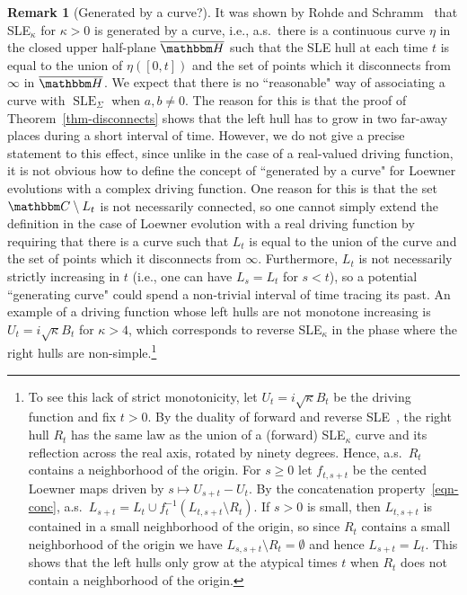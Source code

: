 \documentclass[11pt]{article}
\theoremstyle{plain}
\theoremstyle{definition}
\newtheorem{remark}[thm]{Remark}
\numberwithin{equation}{section}
\newcommand{\BB}{\mathbbm}
\newcommand{\ol}{\overline}
\newcommand{\SLEG}{{\operatorname{SLE}}_\Sigma}
\begin{document}
\begin{remark}[Generated by a curve?] \label{remark-curve}
It was shown by Rohde and Schramm~\cite{schramm-sle} that SLE$_\kappa$ for $\kappa > 0$ is generated by a curve, i.e., a.s.\ there is a continuous curve $\eta$ in the closed upper half-plane $\ol{\BB H}$ such that the SLE hull at each time $t$ is equal to the union of $\eta([0,t])$ and the set of points which it disconnects from $\infty$ in $\ol{\BB H}$. 
We expect that there is no ``reasonable" way of associating a curve with $\SLEG$ when $a,b\not=0$. The reason for this is that the proof of Theorem~\ref{thm-disconnects} shows that the left hull has to grow in two far-away places during a short interval of time. However, we do not give a precise statement to this effect, since unlike in the case of a real-valued driving function, it is not obvious how to define the concept of ``generated by a curve" for Loewner evolutions with a complex driving function. One reason for this is that the set $\BB C\setminus L_t$ is not necessarily connected, so one cannot simply extend the definition in the case of Loewner evolution with a real driving function by requiring that there is a curve such that $L_t$ is equal to the union of the curve and the set of points which it disconnects from $\infty$. 
Furthermore, $L_t$ is not necessarily strictly increasing in $t$ (i.e., one can have $L_s = L_t$ for $s<t$), so a potential ``generating curve" could spend a non-trivial interval of time tracing its past. 
An example of a driving function whose left hulls are not monotone increasing is $U_t = i\sqrt\kappa B_t$ for $\kappa  > 4$, which corresponds to reverse SLE$_\kappa$ in the phase where the right hulls are non-simple.\footnote{
To see this lack of strict monotonicity, let $U_t = i\sqrt\kappa B_t$ be the driving function and fix $t > 0$. By the duality of forward and reverse SLE~\cite{schramm-sle}, the right hull $R_t$ has the same law as the union of a (forward) SLE$_\kappa$ curve and its reflection across the real axis, rotated by ninety degrees. Hence, a.s.\ $R_t  $ contains a neighborhood of the origin.  
For $s \geq 0$ let $f_{t,s+t}$ be the cented Loewner maps driven by $s\mapsto U_{s+t} - U_t$. By the concatenation property~\eqref{eqn-conc}, a.s.\ $L_{s+t} = L_t \cup f_t^{-1}(L_{t,s+t} \setminus R_t)$. If $s > 0$ is small, then $L_{t,s+t}$ is contained in a small neighborhood of the origin, so since $R_t$ contains a small neighborhood of the origin we have $L_{s,s+t} \setminus R_t= \emptyset$ and hence $L_{s+t} = L_t$. This shows that the left hulls only grow at the atypical times $t$ when $R_t$ does not contain a neighborhood of the origin.
}
\end{remark}
\end{document}
